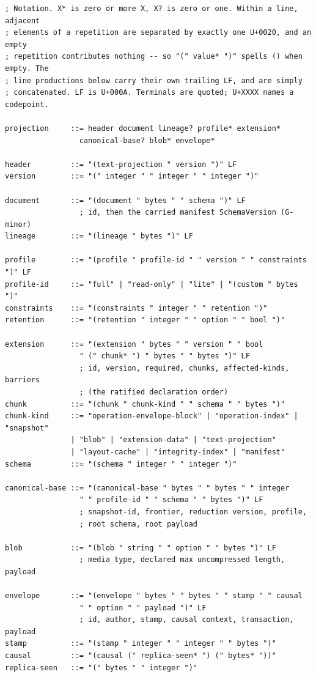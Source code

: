 \documentclass[11pt,letterpaper]{report}
\begin{document}
\begin{lstlisting}
; Notation. X* is zero or more X, X? is zero or one. Within a line, adjacent
; elements of a repetition are separated by exactly one U+0020, and an empty
; repetition contributes nothing -- so "(" value* ")" spells () when empty. The
; line productions below carry their own trailing LF, and are simply
; concatenated. LF is U+000A. Terminals are quoted; U+XXXX names a codepoint.

projection     ::= header document lineage? profile* extension*
                 canonical-base? blob* envelope*

header         ::= "(text-projection " version ")" LF
version        ::= "(" integer " " integer " " integer ")"

document       ::= "(document " bytes " " schema ")" LF
                 ; id, then the carried manifest SchemaVersion (G-minor)
lineage        ::= "(lineage " bytes ")" LF

profile        ::= "(profile " profile-id " " version " " constraints ")" LF
profile-id     ::= "full" | "read-only" | "lite" | "(custom " bytes ")"
constraints    ::= "(constraints " integer " " retention ")"
retention      ::= "(retention " integer " " option " " bool ")"

extension      ::= "(extension " bytes " " version " " bool
                 " (" chunk* ") " bytes " " bytes ")" LF
                 ; id, version, required, chunks, affected-kinds, barriers
                 ; (the ratified declaration order)
chunk          ::= "(chunk " chunk-kind " " schema " " bytes ")"
chunk-kind     ::= "operation-envelope-block" | "operation-index" | "snapshot"
               | "blob" | "extension-data" | "text-projection"
               | "layout-cache" | "integrity-index" | "manifest"
schema         ::= "(schema " integer " " integer ")"

canonical-base ::= "(canonical-base " bytes " " bytes " " integer
                 " " profile-id " " schema " " bytes ")" LF
                 ; snapshot-id, frontier, reduction version, profile,
                 ; root schema, root payload

blob           ::= "(blob " string " " option " " bytes ")" LF
                 ; media type, declared max uncompressed length, payload

envelope       ::= "(envelope " bytes " " bytes " " stamp " " causal
                 " " option " " payload ")" LF
                 ; id, author, stamp, causal context, transaction, payload
stamp          ::= "(stamp " integer " " integer " " bytes ")"
causal         ::= "(causal (" replica-seen* ") (" bytes* "))"
replica-seen   ::= "(" bytes " " integer ")"


\end{lstlisting}
\end{document}

